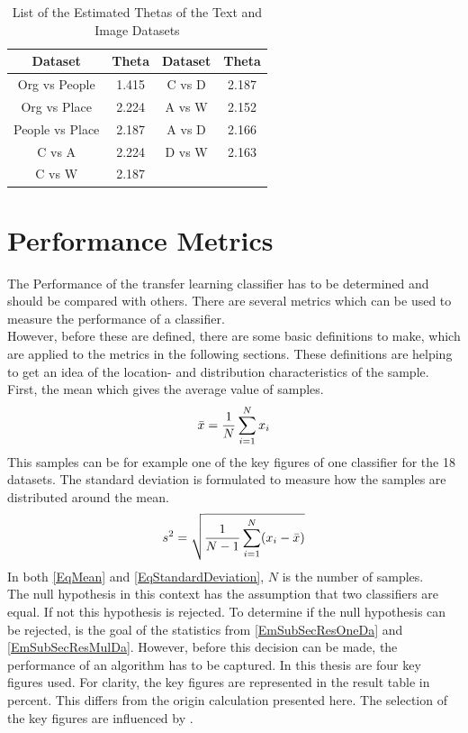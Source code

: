 \begin{table}[]
	\centering
		\begin{tabular}{|c|c||c|c|}
			\hline
			Dataset         & Theta & Dataset & Theta \\ \hline
			Org vs People   & 1.415 & C vs D  & 2.187 \\ \hline
			Org vs Place    & 2.224 & A vs W  & 2.152\\ \hline
			People vs Place & 2.187 & A vs D  & 2.166\\ \hline
			C vs A          & 2.224 & D vs W  & 2.163 \\ \hline
			C vs W          & 2.187\\ \cline{1-2}
	\end{tabular}
	\caption{List of the Estimated Thetas of the Text and Image Datasets\label{TableThetaEst}}
\end{table}

\section{Performance Metrics}\label{EmSubSecPerMet}
The Performance of the transfer learning classifier has to be determined and should be compared with others.
There are several metrics which can be used to measure the performance of a classifier.\\
However, before these are defined, there are some basic definitions to make, which are applied to the metrics in the following sections.
These definitions are helping to get an idea of the location- and distribution characteristics of the sample.\cite[p. 216-217]{Teschl.2014}
First, the mean which gives the average value of samples. 
\begin{equation}\label{EqMean}
	\bar{x} = \frac{1}{N}\sum_{i=1}^{N}x_i
\end{equation}
This samples can be for example one of the key figures of one classifier for the 18 datasets. 
The standard deviation is formulated to measure how the samples are distributed around the mean.
\begin{equation}\label{EqStandardDeviation}
s^2=\sqrt{\frac{1}{N-1}\sum_{i=1}^{N}(x_i-\bar{x})}
\end{equation}
In both \eqref{EqMean} and \eqref{EqStandardDeviation}, $N$ is the number of samples. \\
The null hypothesis in this context has the assumption that two classifiers are equal.
If not this hypothesis is rejected.\cite{Alpaydm.1999} 
To determine if the null hypothesis can be rejected, is the goal of the statistics from \ref{EmSubSecResOneDa} and \ref{EmSubSecResMulDa}.
However, before this decision can be made, the performance of an algorithm has to be captured.
In this thesis are four key figures used.
For clarity, the key figures are represented in the result table in percent.
This differs from the origin calculation presented here.
The selection of the key figures are influenced by \cite{Chen.2009}.\\
